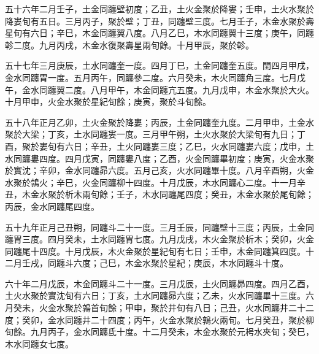 \begin{pinyinscope}
五十六年二月壬子，土金同躔壁初度；乙丑，土火金聚於降婁；壬申，土火水聚於降婁旬有五日。三月丙子，聚於壁；丁丑，同躔壁三度。七月壬子，木金水聚於壽星旬有六日；辛巳，木金同躔翼八度。八月乙巳，木水同躔翼十三度；庚午，同躔軫二度。九月丙戌，木金水復聚壽星兩旬餘。十月甲辰，聚於軫。

五十七年三月庚辰，土水同躔奎一度。四月丁巳，土金同躔奎五度。閏四月甲戌，金水同躔胃一度。五月丙午，同躔參二度。六月癸未，木火同躔角三度。七月戊午，金水同躔翼二度。八月甲午，木金同躔亢五度。九月戊申，木金水聚於大火。十月甲申，火金水聚於星紀旬餘；庚寅，聚於斗旬餘。

五十八年正月乙卯，土火金聚於降婁；丙辰，土金同躔奎九度。二月甲申，土金水聚於大梁；丁亥，土水同躔婁一度。三月甲午朔，土火水聚於大梁旬有九日；丁酉，聚於婁旬有六日；辛丑，土火同躔婁三度；乙巳，火水同躔婁六度；戊申，土水同躔婁四度。四月戊寅，同躔婁八度；乙酉，火金同躔畢初度；庚寅，火金水聚於實沈；辛卯，金水同躔昴六度。五月己亥，火水同躔畢十度。八月辛酉朔，火金水聚於鶉火；辛巳，火金同躔柳十四度。十月戊辰，木水同躔心二度。十一月辛丑，木金水聚於析木兩旬餘；壬子，木水同躔尾四度；癸丑，木金水聚於尾旬餘；丙辰，金水同躔尾四度。

五十九年正月己丑朔，同躔斗二十一度。三月壬辰，同躔壁十三度；丙辰，土金同躔胃三度。四月癸未，土水同躔胃七度。九月戊戌，木火金聚於析木；癸卯，火金同躔尾十四度。十月戊辰，木火金聚於星紀旬有七日；壬申，木金同躔箕四度。十二月壬戌，同躔斗六度；己巳，木金水聚於星紀；庚辰，木水同躔斗十度。

六十年二月戊辰，木金同躔斗二十一度。三月戊辰，土火同躔昴四度。四月乙酉，土火水聚於實沈旬有六日；丁亥，土水同躔昴六度；乙未，火水同躔畢十三度。六月癸未，火金水聚於鶉首旬餘；甲申，聚於井旬有八日；己丑，火水同躔井二十二度；癸卯，金水同躔井二十四度；丙午，火金水聚於鶉火兩旬。七月癸丑，聚於柳旬餘。九月丙子，金水同躔氐十度。十二月癸未，木金水聚於元枵水夾旬；癸巳，木水同躔女七度。


\end{pinyinscope}